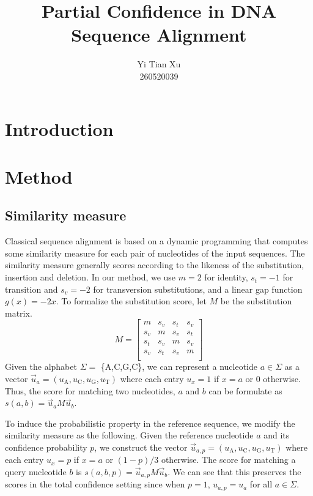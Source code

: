 \documentclass{article}
\begin{document}
\title{Partial Confidence in DNA Sequence Alignment}
\author{Yi Tian Xu\\260520039}

\maketitle

\abstract{}


\section{Introduction}

\section{Method}

\subsection{Similarity measure}

Classical sequence alignment is based on a dynamic programming that computes some similarity measure for each pair of nucleotides of the input sequences. The similarity measure generally scores according to the likeness of the substitution, insertion and deletion. In our method, we use $m = 2$ for identity, $s_t = -1$ for transition and $s_v = -2$ for transversion substitutions, and a linear gap function $g(x)=-2x$. To formalize the substitution score, let $M$ be the substitution matrix. 
\begin{equation}
	M = \begin{bmatrix}
		m & s_v & s_t & s_v\\
		s_v & m & s_v & s_t\\
		s_t & s_v & m & s_v\\
		s_v & s_t & s_v & m\\
	\end{bmatrix}
\end{equation}
Given the alphabet $\Sigma =$ \{A,C,G,C\}, we can represent a nucleotide $a \in \Sigma$ as a vector $\vec{u}_a = (u_{\mbox{A}}, u_{\mbox{C}}, u_{\mbox{G}}, u_{\mbox{T}})$ where each entry $u_x = 1$ if $x = a$ or 0 otherwise. Thus, the score for matching two nucleotides, $a$ and $b$ can be formulate as $s(a,b) = \vec{u}_aM\vec{u}_b$.

To induce the probabilistic property in the reference sequence, we modify the similarity measure as the following. Given the reference nucleotide $a$ and its confidence probability $p$, we construct the vector $\vec{u}_{a,p} = (u_{\mbox{A}}, u_{\mbox{C}}, u_{\mbox{G}}, u_{\mbox{T}})$ where each entry $u_x = p$ if $x=a$ or $(1-p)/3$ otherwise. The score for matching a query nucleotide $b$ is $s(a,b,p) = \vec{u}_{a,p}M\vec{u}_b$. We can see that this preserves the scores in the total confidence setting since when $p=1$, $u_{a,p} = u_a$ for all $a \in \Sigma$. 
\end{document}
